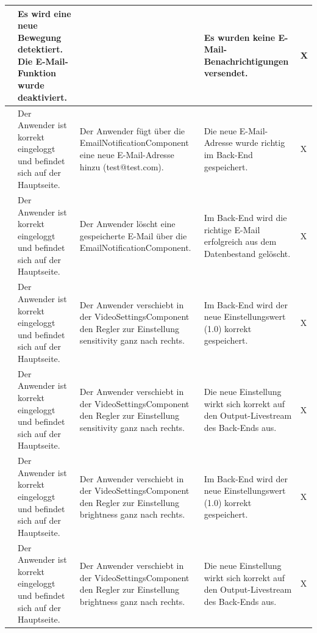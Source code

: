 \begin{longtable}{| p{} | p{} | p{} | p{} | p{} |}
	\stepcounter{SysTestNumber}\arabic{SysTestNumber} & Es wird eine neue Bewegung detektiert. Die E-Mail-Funktion wurde deaktiviert. & & Es wurden keine E-Mail-Benachrichtigungen versendet. & X \\ \hline
	
	\stepcounter{SysTestNumber}\arabic{SysTestNumber} & Der Anwender ist korrekt eingeloggt und befindet sich auf der Hauptseite. & Der Anwender fügt über die EmailNotificationComponent eine neue E-Mail-Adresse hinzu (test@test.com). & Die neue E-Mail-Adresse wurde richtig im Back-End gespeichert. & X \\ \hline
	
	\stepcounter{SysTestNumber}\arabic{SysTestNumber} & Der Anwender ist korrekt eingeloggt und befindet sich auf der Hauptseite. & Der Anwender löscht eine gespeicherte E-Mail über die EmailNotificationComponent. & Im Back-End wird die richtige E-Mail erfolgreich aus dem Datenbestand gelöscht. & X \\ \hline
	
	\stepcounter{SysTestNumber}\arabic{SysTestNumber} & Der Anwender ist korrekt eingeloggt und befindet sich auf der Hauptseite. & Der Anwender verschiebt in der VideoSettingsComponent den Regler zur Einstellung \glqq{}sensitivity\grqq{} ganz nach rechts. & Im Back-End wird der neue Einstellungswert (1.0) korrekt gespeichert. & X \\ \hline
	
	\stepcounter{SysTestNumber}\arabic{SysTestNumber} & Der Anwender ist korrekt eingeloggt und befindet sich auf der Hauptseite. & Der Anwender verschiebt in der VideoSettingsComponent den Regler zur Einstellung \glqq{}sensitivity\grqq{} ganz nach rechts. & Die neue Einstellung wirkt sich korrekt auf den Output-Livestream des Back-Ends aus. & X \\ \hline
	
	\stepcounter{SysTestNumber}\arabic{SysTestNumber} & Der Anwender ist korrekt eingeloggt und befindet sich auf der Hauptseite. & Der Anwender verschiebt in der VideoSettingsComponent den Regler zur Einstellung \glqq{}brightness\grqq{} ganz nach rechts. & Im Back-End wird der neue Einstellungswert (1.0) korrekt gespeichert. & X \\ \hline
	
	\stepcounter{SysTestNumber}\arabic{SysTestNumber} & Der Anwender ist korrekt eingeloggt und befindet sich auf der Hauptseite. & Der Anwender verschiebt in der VideoSettingsComponent den Regler zur Einstellung \glqq{}brightness\grqq{} ganz nach rechts. & Die neue Einstellung wirkt sich korrekt auf den Output-Livestream des Back-Ends aus. & X \\ \hline
	

\end{longtable}

